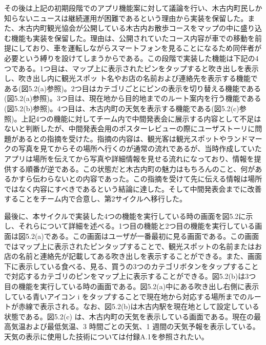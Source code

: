 その後は上記の初期段階でのアプリ機能案に対して議論を行い、木古内町民しか知らないニュースは継続運用が困難であるという理由から実装を保留した。また、木古内町観光協会が公開している木古内お散歩コースをマップの中に盛り込む機能も実装を保留した。理由は、公開されていたコース内容が車での移動を前提にしており、車を運転しながらスマートフォンを見ることになるため同伴者が必要という縛りを設けてしまうからである。この段階で実装した機能は下記の4つである。1つ目は、マップ上に表示されたピンをタップすると吹き出しを表示し、吹き出し内に観光スポッ ト名やお店の名前および連絡先を表示する機能である(図5.2(a)参照)。2つ目はカテゴリごとにピンの表示を切り替える機能である(図5.2(a)参照)。3つ目は、現在地から目的地までのルート案内を行う機能である(図5.2(b)参照)。4つ目は、木古内町の天気を表示する機能である(図5.2(c)参照)。上記4つの機能に対してチーム内で中間発表会に展示する内容として不足はないと判断したが、中間発表会用のポスターレビューの際にユーザストーリに問題があるとの指摘を受けた。指摘の内容は、観光客は観光スポットやランドマークの写真を見てからその場所へ行くのが通常の流れであるが、当時作成していたアプリは場所を伝えてから写真や詳細情報を見せる流れになっており、情報を提供する順番が逆である。この状態だと木古内町の魅力はもちろんのこと、何があるかすら伝わらないとの内容であった。この指摘を受けて先に伝える情報は場所ではなく内容にすべきであるという結論に達した。そして中間発表会までに改善することをチーム内で合意し、第2サイクルへ移行した。\par

最後に、本サイクルで実装した4つの機能を実行している時の画面を図5.2に示し、それらについて詳細を述べる。1つ目の機能と2つ目の機能を実行している画面は図5.2(a)である。この画面はユーザが一番最初に見る画面である。この画面ではマップ上に表示されたピンタップすることで、観光スポットの名前またはお店の名前と連絡先が記載してある吹き出しを表示することができる。また、画面下に表示している食べる、見る、買うの3つのカテゴリボタンをタップすることで対応するカテゴリのピンをマップ上に表示することができる。図5.2(b)は3つ目の機能を実行している時の画面である。図5.2(a)中にある吹き出し右側に表示している青いアイコン i をタップすることで現在地から対応する場所までのルートが赤線で表示される。なお、図5.2(b)は木古内駅を現在地として設定している状態である。図5.2(c) は、木古内町の天気を表示している画面である。現在の最高気温および最低気温、3 時間ごとの天気、1 週間の天気予報を表示している。天気の表示に使用した技術については付録A.1を参照されたい。

